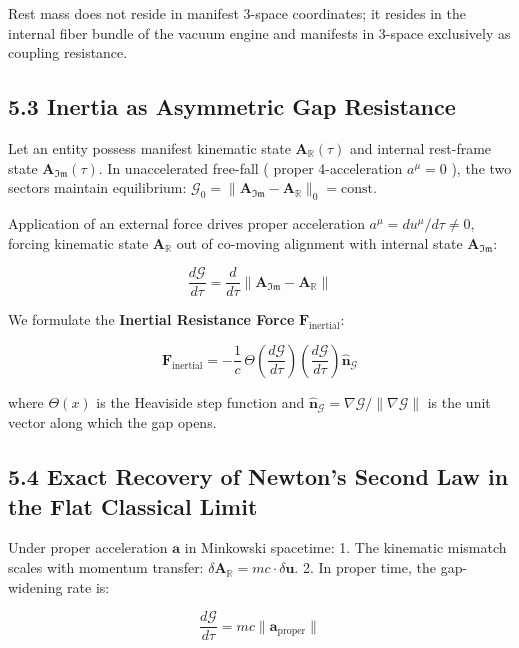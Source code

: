 \documentclass[11pt,a4paper]{article}
\theoremstyle{definition}\newtheorem{definition}{Definition}
\theoremstyle{remark}\newtheorem{remark}{Remark}
\begin{document}
Rest mass does not reside in manifest 3-space coordinates; it resides in the internal fiber bundle of the vacuum engine and manifests in 3-space exclusively as coupling resistance.
\subsection{5.3 Inertia as Asymmetric Gap Resistance}

Let an entity possess manifest kinematic state $\mathbf{A}_{\mathbb{R}}(\tau)$ and internal rest-frame state $\mathbf{A}_{\mathfrak{Im}}(\tau)$. In unaccelerated free-fall ( proper 4-acceleration $a^\mu = 0$ ), the two sectors maintain equilibrium: $\mathcal{G}_0 = \|\mathbf{A}_{\mathfrak{Im}} - \mathbf{A}_{\mathbb{R}}\|_0 = \text{const}$.

Application of an external force drives proper acceleration $a^\mu = du^\mu/d\tau \neq 0$, forcing kinematic state $\mathbf{A}_{\mathbb{R}}$ out of co-moving alignment with internal state $\mathbf{A}_{\mathfrak{Im}}$:


\begin{equation}
\frac{d\mathcal{G}}{d\tau} = \frac{d}{d\tau} \|\mathbf{A}_{\mathfrak{Im}} - \mathbf{A}_{\mathbb{R}}\|
\end{equation}


We formulate the \textbf{Inertial Resistance Force} $\mathbf{F}_{\text{inertial}}$:


\begin{equation}
\mathbf{F}_{\text{inertial}} = -\frac{1}{c} \, \Theta\left(\frac{d\mathcal{G}}{d\tau}\right) \left( \frac{d\mathcal{G}}{d\tau} \right) \hat{\mathbf{n}}_{\mathcal{G}}
\end{equation}


where $\Theta(x)$ is the Heaviside step function and $\hat{\mathbf{n}}_{\mathcal{G}} = \nabla\mathcal{G}/\|\nabla\mathcal{G}\|$ is the unit vector along which the gap opens.
\subsection{5.4 Exact Recovery of Newton's Second Law in the Flat Classical Limit}

Under proper acceleration $\mathbf{a}$ in Minkowski spacetime:
1. The kinematic mismatch scales with momentum transfer: $\delta \mathbf{A}_{\mathbb{R}} = m c \cdot \delta \mathbf{u}$.
2. In proper time, the gap-widening rate is:


\begin{equation}
\frac{d\mathcal{G}}{d\tau} = m c \|\mathbf{a}_{\text{proper}}\|
\end{equation}
\end{document}
